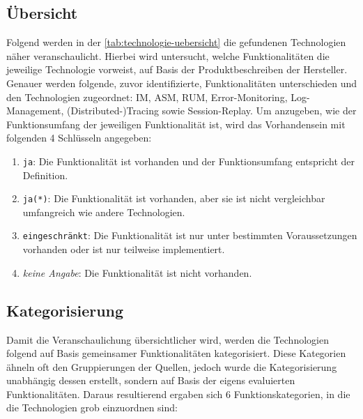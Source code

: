 \subsection{Übersicht}

Folgend werden in der \autoref{tab:technologie-uebersicht} die gefundenen Technologien näher veranschaulicht. Hierbei wird untersucht, welche Funktionalitäten die jeweilige Technologie vorweist, auf Basis der Produktbeschreiben der Hersteller. Genauer werden folgende, zuvor identifizierte, Funktionalitäten unterschieden und den Technologien zugeordnet: IM, ASM, RUM, Error-Monitoring, Log-Management, (Distributed-)Tracing sowie Session-Replay. Um anzugeben, wie der Funktionsumfang der jeweiligen Funktionalität ist, wird das Vorhandensein mit folgenden 4 Schlüsseln angegeben:

\begin{enumerate}
	\item \texttt{ja}: Die Funktionalität ist vorhanden und der Funktionsumfang entspricht der Definition.
	\item \texttt{ja(*)}: Die Funktionalität ist vorhanden, aber sie ist nicht vergleichbar umfangreich wie andere Technologien.
	\item \texttt{eingeschränkt}: Die Funktionalität ist nur unter bestimmten Voraussetzungen vorhanden oder ist nur teilweise implementiert.
	\item \textit{keine Angabe}: Die Funktionalität ist nicht vorhanden.
\end{enumerate}



\subsection{Kategorisierung}

Damit die Veranschaulichung übersichtlicher wird, werden die Technologien folgend auf Basis gemeinsamer Funktionalitäten kategorisiert. Diese Kategorien ähneln oft den Gruppierungen der Quellen, jedoch wurde die Kategorisierung unabhängig dessen erstellt, sondern auf Basis der eigens evaluierten Funktionalitäten. Daraus resultierend ergaben sich 6 Funktionskategorien, in die die Technologien grob einzuordnen sind:

